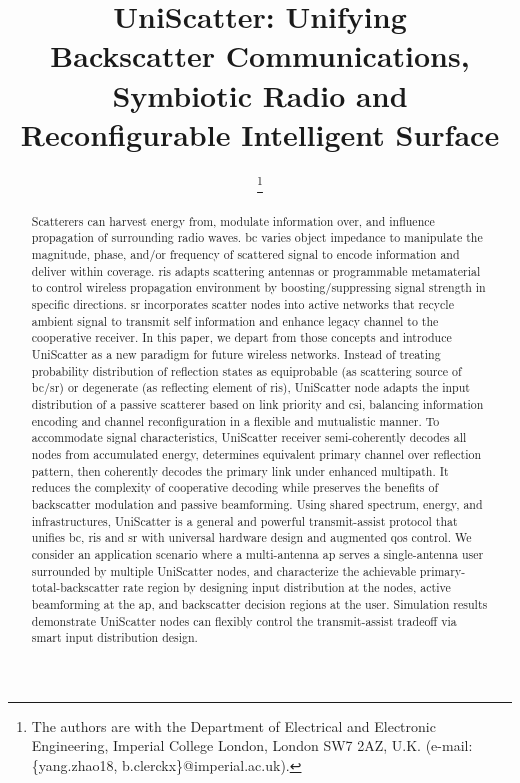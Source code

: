 \documentclass[journal]{IEEEtran}
\begin{document}
\title{UniScatter: Unifying\\Backscatter Communications, Symbiotic Radio and Reconfigurable Intelligent Surface}
\author{
	\thanks{
		The authors are with the Department of Electrical and Electronic Engineering, Imperial College London, London SW7 2AZ, U.K. (e-mail: \{yang.zhao18, b.clerckx\}@imperial.ac.uk).
	}
}
\maketitle

\begin{abstract}
	Scatterers can harvest energy from, modulate information over, and influence propagation of surrounding radio waves.
	\gls{bc} varies object impedance to manipulate the magnitude, phase, and/or frequency of scattered signal to encode information and deliver within coverage.
	\gls{ris} adapts scattering antennas or programmable metamaterial to control wireless propagation environment by boosting/suppressing signal strength in specific directions.
	\gls{sr} incorporates scatter nodes into active networks that recycle ambient signal to transmit self information and enhance legacy channel to the cooperative receiver.
	In this paper, we depart from those concepts and introduce UniScatter as a new paradigm for future wireless networks.
	Instead of treating probability distribution of reflection states as equiprobable (as scattering source of \gls{bc}/\gls{sr}) or degenerate (as reflecting element of \gls{ris}), UniScatter node adapts the input distribution of a passive scatterer based on link priority and \gls{csi}, balancing information encoding and channel reconfiguration in a flexible and mutualistic manner.
	To accommodate signal characteristics, UniScatter receiver semi-coherently decodes all nodes from accumulated energy, determines equivalent primary channel over reflection pattern, then coherently decodes the primary link under enhanced multipath.
	It reduces the complexity of cooperative decoding while preserves the benefits of backscatter modulation and passive beamforming.
	Using shared spectrum, energy, and infrastructures, UniScatter is a general and powerful transmit-assist protocol that unifies \gls{bc}, \gls{ris} and \gls{sr} with universal hardware design and augmented \gls{qos} control.
	We consider an application scenario where a multi-antenna \gls{ap} serves a single-antenna user surrounded by multiple UniScatter nodes, and characterize the achievable primary-total-backscatter rate region by designing input distribution at the nodes, active beamforming at the \gls{ap}, and backscatter decision regions at the user.
	Simulation results demonstrate UniScatter nodes can flexibly control the transmit-assist tradeoff via smart input distribution design.
\end{abstract}
\end{document}
